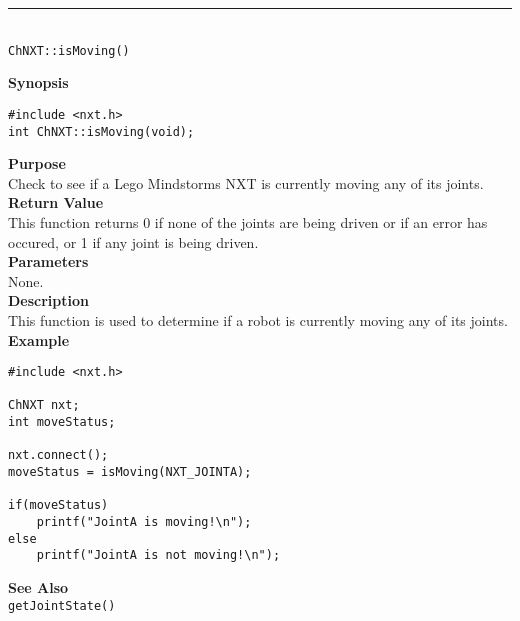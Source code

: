 \noindent
\vspace{5pt}
\rule{4.5in}{0.015in}\\
\noindent
{\LARGE \texttt{ChNXT::isMoving()} }\\


\noindent
{\bf Synopsis}
\begin{lstlisting}
#include <nxt.h>
int ChNXT::isMoving(void);
\end{lstlisting}

\noindent
{\bf Purpose}\\
Check to see if a Lego Mindstorms NXT is currently moving any of its joints.\\

\noindent
{\bf Return Value}\\
This function returns 0 if none of the joints are being driven or 
if an error has occured, or 1 if any joint is being driven.\\

\noindent
{\bf Parameters}\\
None.\\

\noindent
{\bf Description}\\
This function is used to determine if a robot is currently moving any of its joints.\\

\noindent
{\bf Example}
\begin{lstlisting}
#include <nxt.h>

ChNXT nxt;
int moveStatus;

nxt.connect();
moveStatus = isMoving(NXT_JOINTA);

if(moveStatus)
    printf("JointA is moving!\n");
else
    printf("JointA is not moving!\n");
\end{lstlisting}

\noindent
{\bf See Also}\\
\texttt{getJointState()}\\
